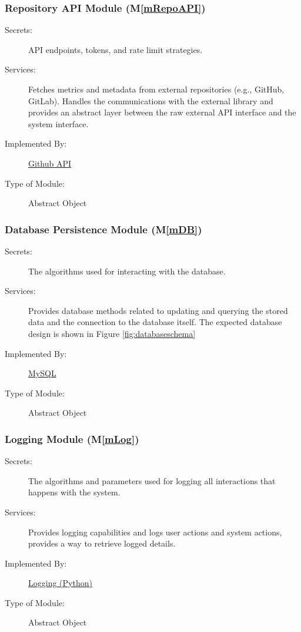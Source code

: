 \documentclass[12pt, titlepage]{article}
\newcommand{\mref}[1]{M\ref{#1}}
\begin{document}
\subsubsection{Repository API Module (\mref{mRepoAPI})}
\begin{description}
\item[Secrets:] API endpoints, tokens, and rate limit strategies.
\item[Services:] Fetches metrics and metadata from external repositories (e.g., GitHub, GitLab). Handles the communications with the external library and provides an abstract layer between the raw external API interface and the system interface.
\item[Implemented By:] \href{https://docs.github.com/en/rest?apiVersion=2022-11-28}{Github API}
\item[Type of Module:] Abstract Object
\end{description}

\subsubsection{Database Persistence Module (\mref{mDB})}
\begin{description}
\item[Secrets:] The algorithms used for interacting with the database.
\item[Services:] Provides database methods related to updating and querying the stored data and the connection to the database itself. The expected database design is shown in Figure \ref{fig:databaseschema}
\item[Implemented By:] \href{https://www.mysql.com/}{MySQL}
\item[Type of Module:] Abstract Object
\end{description}

\subsubsection{Logging Module (\mref{mLog})}
\begin{description}
\item[Secrets:] The algorithms and parameters used for logging all interactions that happens with the system.
\item[Services:] Provides logging capabilities and logs user actions and system actions, provides a way to retrieve logged details.
\item[Implemented By:] \href{https://docs.python.org/3/library/logging.html}{Logging (Python)}
\item[Type of Module:] Abstract Object
\end{description}
\end{document}
